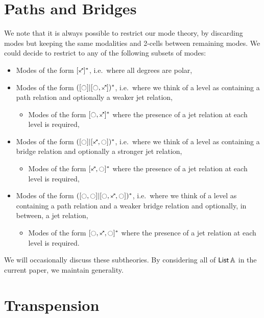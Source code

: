 \documentclass[a4paper]{memoir}
\begin{document}
\chapter{Paths and Bridges}
\begin{remark} 
	We note that it is always possible to restrict our mode theory, by discarding modes but keeping the same modalities and 2-cells between remaining modes.
	We could decide to restrict to any of the following subsets of modes:
	\begin{itemize}
		\item Modes of the form $[\ypolar]^*$, i.e.\ where all degrees are polar,
		\item Modes of the form $([\npolar] | [\npolar, \ypolar])^*$, i.e.\ where we think of a level as containing a path relation and optionally a weaker jet relation,
		\begin{itemize}
			\item Modes of the form $[\npolar, \ypolar]^*$ where the presence of a jet relation at each level is required,
		\end{itemize}
		\item Modes of the form $([\npolar] | [\ypolar, \npolar])^*$, i.e.\ where we think of a level as containing a bridge relation and optionally a stronger jet relation,
		\begin{itemize}
			\item Modes of the form $[\ypolar, \npolar]^*$ where the presence of a jet relation at each level is required,
		\end{itemize}
		\item Modes of the form $([\npolar, \npolar] | [\npolar, \ypolar, \npolar])^*$, i.e.\ where we think of a level as containing a path relation and a weaker bridge relation and optionally, in between, a jet relation,
		\begin{itemize}
			\item Modes of the form $[\npolar, \ypolar, \npolar]^*$ where the presence of a jet relation at each level is required.
		\end{itemize}
	\end{itemize}
	We will occasionally discuss these subtheories. By considering all of ${\mathsf{List}}\,{\mathbb{A}}$ in the current paper, we maintain generality.
\end{remark}

\chapter{Transpension}



\end{document}
